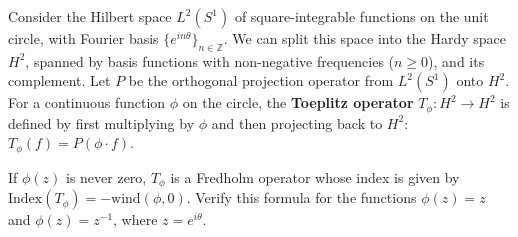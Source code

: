     



\begin{exercise}
    Consider the Hilbert space $L^2(S^1)$ of square-integrable functions on the unit circle, with Fourier basis $\{e^{in\theta}\}_{n\in\mathbb{Z}}$. We can split this space into the Hardy space $H^2$, spanned by basis functions with non-negative frequencies ($n \ge 0$), and its complement. Let $P$ be the orthogonal projection operator from $L^2(S^1)$ onto $H^2$.
    For a continuous function $\phi$ on the circle, the \textbf{Toeplitz operator} $T_\phi: H^2 \to H^2$ is defined by first multiplying by $\phi$ and then projecting back to $H^2$: $T_\phi(f) = P(\phi \cdot f)$.
    
    If $\phi(z)$ is never zero, $T_\phi$ is a Fredholm operator whose index is given by $\text{Index}(T_\phi) = -\text{wind}(\phi, 0)$.
    Verify this formula for the functions $\phi(z) = z$ and $\phi(z) = z^{-1}$, where $z=e^{i\theta}$.
\end{exercise}


